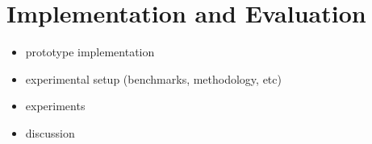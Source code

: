 \section{Implementation and Evaluation}

\begin{itemize}
	\item prototype implementation
	\item experimental setup (benchmarks, methodology, etc)
	\item experiments
	\item discussion
\end{itemize}